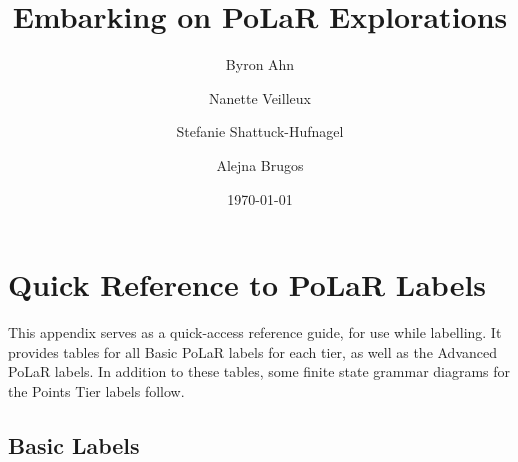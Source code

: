 \documentclass[11pt, twoside]{memoir}
\def\THIStitle{Embarking on PoLaR Explorations}
\def\THISsubtitle{A Framework for Intonational Annotation and Analysis}
\begin{document}
\frontmatter
{}

\title{\THIStitle}
\author{Byron Ahn \and Nanette Veilleux \and Stefanie Shattuck-Hufnagel \and Alejna Brugos}
\date{\today}


\tableofcontents
\newpage
\listoffigures
\listoftables
\newpage

\mainmatter
\chapter{Quick Reference to PoLaR Labels}\label{sec:polar-quick-reference-to-labels}

This appendix serves as a quick-access reference guide, for use while labelling. It provides tables for all Basic PoLaR labels for each tier, as well as the Advanced PoLaR labels. In addition to these tables, some finite state grammar diagrams for the Points Tier labels follow.


\section*{Basic Labels}
\end{document}
